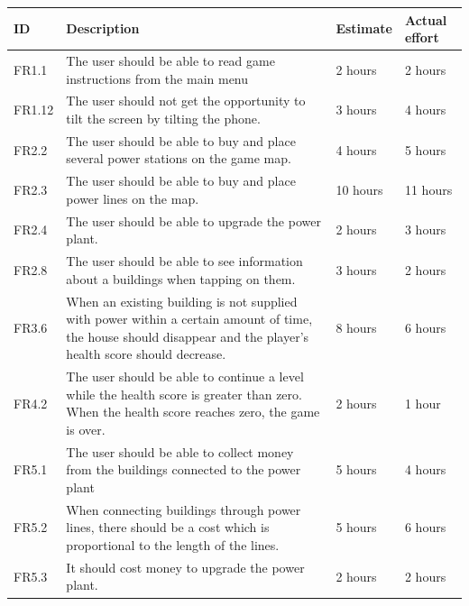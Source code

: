 	\begin{table}[H]
	\begin{tabular}{| p{1cm} | p{7cm} | p{2cm} | p{2cm} |}
		\hline
		\rowcolor{gray}
		ID & Description & Estimate & Actual effort \\ \hline
		FR1.1 & The user should be able to read game instructions from the main menu
		& 2 hours & 2 hours \\ \hline

		FR1.12 & The user should not get the opportunity to tilt the screen by tilting the phone. 
		& 3 hours & 4 hours \\ \hline
		
		FR2.2 & The user should be able to buy and place several power stations on the game map.
		& 4 hours & 5 hours \\ \hline

		FR2.3 & The user should be able to buy and place power lines on the map. 
		& 10 hours & 11 hours \\ \hline

		FR2.4 & The user should be able to upgrade the power plant. 
		& 2 hours & 3 hours \\ \hline

		FR2.8 & The user should be able to see information about a buildings when tapping on them.
		& 3 hours & 2 hours \\ \hline

		FR3.6 & When an existing building is not supplied with power within a certain amount of time, 
		the house should disappear and the player's health score should decrease. 
		& 8 hours & 6 hours \\ \hline

		FR4.2 & The user should be able to continue a level while the health score is greater than zero. 
		When the health score reaches zero, the game is over. 
		& 2 hours & 1 hour \\ \hline

		FR5.1 & The user should be able to collect money from the buildings connected to the power plant
		& 5 hours & 4 hours \\ \hline

		FR5.2 & When connecting buildings through power lines, there should be a cost which is 
		proportional to the length of the lines. 
		& 5 hours & 6 hours \\ \hline

		FR5.3 & It should cost money to upgrade the power plant. 
		& 2 hours & 2 hours \\ \hline


\end{tabular}
\end{table}
